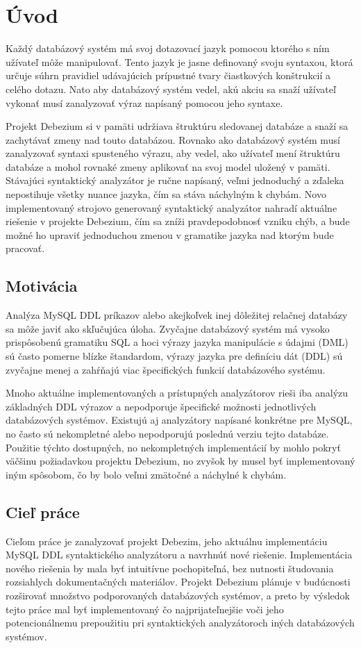 \chapter{Úvod}
Každý databázový systém má svoj dotazovací jazyk pomocou ktorého s ním užívateľ môže manipulovať. Tento jazyk je jasne definovaný svoju syntaxou, ktorá určuje súhrn pravidiel udávajúcich prípustné tvary čiastkových konštrukcií a celého dotazu. Nato aby databázový systém vedel, akú akciu sa snaží užívateľ vykonať musí zanalyzovať výraz napísaný pomocou jeho syntaxe.

Projekt Debezium si v pamäti udržiava štruktúru sledovanej databáze a snaží sa zachytávať zmeny nad touto databázou. Rovnako ako databázový systém musí zanalyzovať syntaxi spusteného výrazu, aby vedel, ako užívateľ mení štruktúru databáze a mohol rovnaké zmeny aplikovať na svoj model uložený v pamäti.
Stávajúci syntaktický analyzátor je ručne napísaný, veľmi jednoduchý a zďaleka nepostihuje všetky nuance  jazyka, čím sa stáva náchylným k chybám. Novo implementovaný strojovo generovaný syntaktický analyzátor nahradí aktuálne riešenie v projekte Debezium, čím sa zníži pravdepodobnosť vzniku chýb, a bude možné ho upraviť jednoduchou zmenou v gramatike jazyka nad ktorým bude pracovať.

\section{Motivácia}
Analýza MySQL DDL príkazov alebo akejkoľvek inej dôležitej relačnej databázy sa môže javiť ako skľučujúca úloha. Zvyčajne databázový systém má vysoko prispôsobenú gramatiku SQL a hoci výrazy jazyka manipulácie s údajmi (DML) sú často pomerne blízke štandardom, výrazy jazyka pre definíciu dát (DDL) sú zvyčajne menej a zahŕňajú viac špecifických funkcií databázového systému.

Mnoho aktuálne implementovaných a prístupných analyzátorov rieši iba analýzu základných DDL výrazov a nepodporuje špecifické možnosti jednotlivých databázových systémov. Existujú aj analyzátory napísané konkrétne pre MySQL, no často sú nekompletné  alebo nepodporujú poslednú verziu tejto databáze. Použitie týchto dostupných, no nekompletných implementácií by mohlo pokryť väčšinu požiadavkou projektu Debezium, no zvyšok by musel byť implementovaný iným spôsobom, čo by bolo veľmi zmätočné a náchylné k chybám.

\section{Cieľ práce}
Cieľom práce je zanalyzovať projekt Debezim, jeho aktuálnu implementáciu MySQL DDL syntaktického analyzátoru a navrhnúť nové riešenie. Implementácia nového riešenia by mala byť intuitívne pochopiteľná, bez nutnosti študovania rozsiahlych dokumentačných materiálov. Projekt Debezium plánuje v budúcnosti rozširovať množstvo podporovaných databázových systémov, a preto by výsledok tejto práce mal byť implementovaný čo najprijateľnejšie voči jeho potencionálnemu prepoužitiu pri syntaktických analyzátoroch iných databázových systémov.